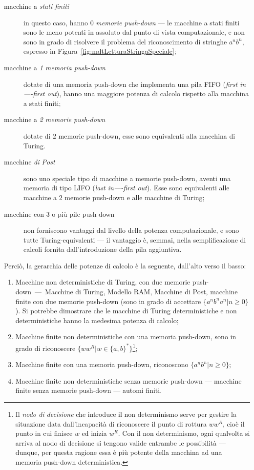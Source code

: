 \documentclass[10pt]{\classname}
\begin{document}
\begin{description}
    \item[macchine a \emph{stati finiti}] in questo caso, hanno $0$
        \emph{memorie push-down} --- le macchine a stati finiti sono le meno
        potenti in assoluto dal punto di vista computazionale, e non sono in
        grado di risolvere il problema del riconoscimento di stringhe $a^n
        b^n$, espresso in Figura~\ref{fig:mdtLetturaStringaSpeciale};
    \item[macchine a \emph{1 memoria push-down}] dotate di una memoria
        push-down che implementa una pila FIFO (\emph{first in----first out}),
        hanno una maggiore potenza di calcolo rispetto alla macchina a stati
        finiti;
    \item[macchine a \emph{2 memorie push-down}] dotate di $2$ memorie
        push-down, esse sono equivalenti alla macchina di Turing.
    \item[macchine \emph{di Post}] sono uno speciale tipo di macchine a memorie
        push-down, aventi una memoria di tipo LIFO (\emph{last in----first
        out}). Esse sono equivalenti alle macchine a $2$ memorie push-down e
        alle macchine di Turing;
    \item[macchine con 3 o più pile push-down] non forniscono vantaggi dal
        livello della potenza computazionale, e sono tutte Turing-equivalenti
        --- il vantaggio è, semmai, nella semplificazione di calcoli fornita
        dall'introduzione della pila aggiuntiva.
\end{description}


Perciò, la gerarchia delle potenze di calcolo è la seguente, dall'alto verso il basso:
\begin{enumerate}
    \item Macchine non deterministiche di Turing, con due memorie
        push-down~---~Macchine di Turing, Modello RAM, Macchine di Post,
        macchine finite con due memorie push-down (sono in grado di accettare
        $\{a^n b^n a^n| n \geq 0\}$). Si potrebbe dimostrare che le macchine di
        Turing deterministiche e non deterministiche hanno la medesima potenza
        di calcolo; 
    \item Macchine finite non deterministiche con una memoria push-down, sono
        in grado di riconoscere $\{w w^R | w\in\{a,b\}^*\}$\footnote{Il
        \emph{nodo di decisione} che introduce il non determinismo serve per
    gestire la situazione data dall'incapacità di riconoscere il punto di
rottura $ww^R$, cioè il punto in cui finisce $w$ ed inizia $w^R$. Con il non
determinismo, ogni qualvolta si arriva al nodo di decisione si tengono valide
entrambe le possibilità --- dunque, per questa ragione essa è più potente della
macchina ad una memoria push-down deterministica.};
    \item Macchine finite con una memoria push-down, riconoscono $\{a^n
        b^n|n\geq 0\}$;
    \item Macchine finite non deterministiche senza memorie push-down ---
        macchine finite senza memorie push-down --- automi finiti.
\end{enumerate}
\end{document}
